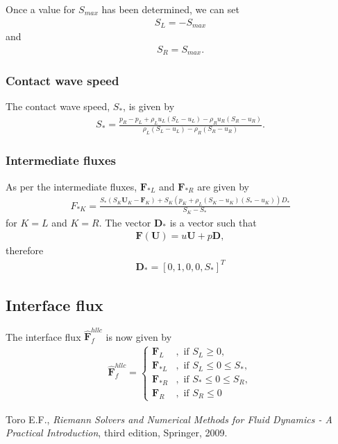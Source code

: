 \documentclass[10pt,letterpaper,notitlepage]{article}
\numberwithin{equation}{section}
\newcommand{\hatbf}[1]{\hat{\mathbf{#1}}}
\newcommand{\beqn}{\begin{equation}\begin{aligned}}
\newcommand{\eeqn}{\end{aligned}\end{equation}}
\begin{document}
Once a value for $S_{max}$ has been determined, we can set 
\beqn 
S_L = -S_{max}
\eeqn 
and
\beqn 
S_R = S_{max}.
\eeqn 

\subsubsection{Contact wave speed}
The contact wave speed, $S_*$, is given by
\beqn 
S_* = \frac{p_R - p_L +\rho_L u_L(S_L-u_L) - \rho_R u_R(S_R-u_R)}
{\rho_L (S_L-u_L) - \rho_R(S_R-u_R)}.
\eeqn 

\subsubsection{Intermediate fluxes}
As per \cite{Toro} the intermediate fluxes, $\mathbf{F}_{*L}$ and $\mathbf{F}_{*R}$ are given by
\beqn 
F_{*K} = 
\frac
{S_* (S_K \mathbf{U}_K - \mathbf{F}_K) + S_K(p_K+\rho_L(S_K-u_K)(S_*-u_K))D_*}
{S_K - S_*}
\eeqn 
for $K=L$ and $K=R$. The vector $\mathbf{D}_*$ is a vector such that
\beqn 
\mathbf{F}(\mathbf{U}) = u \mathbf{U} + p\mathbf{D},
\eeqn 
therefore 
\beqn 
\mathbf{D}_* = [0,1,0,0,S_*]^T
\eeqn 

\subsection{Interface flux}
The interface flux $\hatbf{F}_f^{hllc}$ is now given by
\beqn 
\hatbf{F}_f^{hllc} = 
\begin{cases}
\mathbf{F}_L &,\text{ if } S_L \ge 0, \\
\mathbf{F}_{*L} &,\text{ if } S_L \le 0 \le S_*, \\
\mathbf{F}_{*R} &,\text{ if } S_* \le 0 \le S_R, \\
\mathbf{F}_R &,\text{ if } S_R \le 0
\end{cases}
\eeqn 

\newpage
\begin{thebibliography}{1}
	
	
	 Toro E.F., {\em Riemann Solvers and Numerical Methods for Fluid Dynamics - A Practical Introduction}, third edition, Springer, 2009.
	   
\end{thebibliography}
\end{document}
